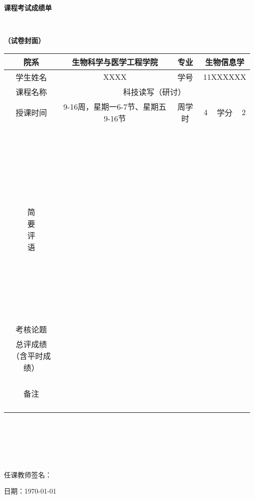 \documentclass[12pt]{article}
\begin{document}
\begin{center}
\fontsize{22pt}{0}\textbf{课程考试成绩单}

~

\fontsize{22pt}{0}\textbf{（试卷封面）}
\end{center}

\begin{table}[htb]
	\centering
	\renewcommand{\arraystretch}{1.5} %
	\begin{tabular}{|c|ccccc|}
		\hline
		院系&生物科学与医学工程学院&\multicolumn{1}{|c|}{专业}&\multicolumn{3}{c|}{生物信息学}\\
		\hline
		学生姓名&XXXX&\multicolumn{1}{|c|}{学号}&\multicolumn{3}{c|}{11XXXXXX}\\
		\hline
		课程名称&\multicolumn{5}{|c|}{科技读写（研讨）}\\
		\hline
		授课时间&9-16周，星期一6-7节、星期五9-16节&\multicolumn{1}{|c|}{周学时}&4&\multicolumn{1}{|c|}{学分}&2\\
		\hline
		\makecell[c]{\\~\\~\\~\\~\\~\\~\\简\\要\\评\\语\\~\\~\\~\\~\\~\\~}&\multicolumn{5}{|l|}{\makecell[l]{
		}}\\
		\hline
		考核论题&\multicolumn{5}{|l|}{\makecell[l]{
			XXXXXXXXXXXXXXXXXXXXXXXXXXXXXXXXXXXXX
		}}\\
		\hline
		\makecell[c]{总评成绩\\（含平时成绩）}&\multicolumn{5}{|l|}{\makecell[l]{
		}}\\
		\hline
		\makecell[c]{~\\备注\\~}&\multicolumn{5}{|l|}{\makecell[l]{
		}}\\
		\hline
	\end{tabular}%
\end{table}

~

~

~

\hspace{8cm}任课教师签名：

\hspace{8cm}日期：\today
\end{document}
